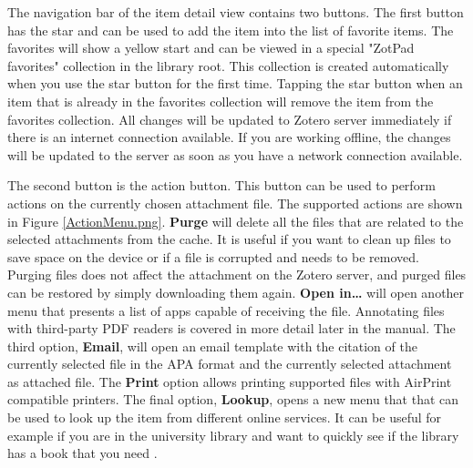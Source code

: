 \documentclass[oneside, openany, 12pt]{tufte-book}
\newcommand{\image}[2]{
	\center
	\fbox{\texttt{[image: images/iPhone/\{\#2]}}}

	\refstepcounter{figure}
	\smallskip\noindent\small Figure \thefigure: #1
	\label{#2}
	}
\newcommand{\ipadfootnote}[1]{}
\newcommand{\image}[2]{
	\caption{#1}
	\label{#2}
	\fbox{\texttt{[image: images/iPad/\{\#2]}}}
	}
\newcommand{\ipadfootnote}[1]{\footnote{#1}}
\begin{document}
The navigation bar of the item detail view contains two buttons. The first button has the star and can be used to add the item into the list of favorite items. The favorites will show a yellow start and can be viewed in a special "ZotPad favorites" collection in the library root. This collection is created automatically when you use the star button for the first time. Tapping the star button when an item that is already in the favorites collection will remove the item from the favorites collection. All changes will be updated to Zotero server immediately if there is an internet connection available. If you are working offline, the changes will be updated to the server as soon as you have a network connection available.

\begin{figure}
\image{Opening the action menu}{ActionMenu.png}
\end{figure}

The second button is the action button. This button can be used to perform actions on the currently chosen attachment file. The supported actions are shown in Figure \ref{ActionMenu.png}. \textbf{Purge} will delete all the files that are related to the selected attachments from the cache. It is useful if you want to clean up files to save space on the device or if a file is corrupted and needs to be removed. Purging files does not affect the attachment on the Zotero server, and purged files can be restored by simply downloading them again. \textbf{Open in\ldots} will open another menu that presents a list of apps capable of receiving the file. Annotating files with third-party PDF readers is covered in more detail later in the manual. The third option, \textbf{Email}, will open an email template with the citation of the currently selected file in the APA format and the currently selected attachment as attached file. The \textbf{Print} option allows printing supported files with AirPrint compatible printers. The final option, \textbf{Lookup}, opens a new menu that that can be used to look up the item from different online services. It can be useful for example if you are in the university library and want to quickly see if the library has a book that you need \ipadfootnote{The lookup functionality is nearly identical to Zotero's locate functionality \url{http://www.zotero.org/support/locate}}.

\clearpage

\begin{figure}
\image{Bottom part of item detail view}{ItemDetails_scrolled.png}
\end{figure}
\end{document}
